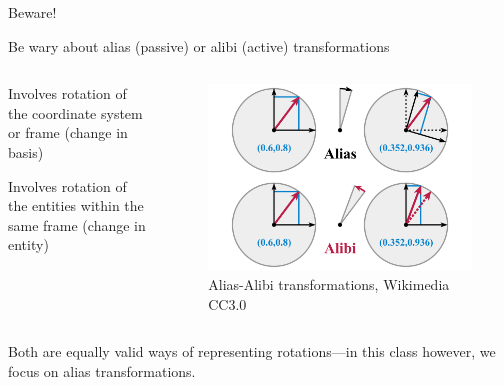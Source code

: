\documentclass[presentation]{beamer}
\begin{document}
\begin{frame}[label={sec:org70ef83a}]{Beware!}
\begin{block}{Be wary about alias (passive) or alibi (active) transformations}
\end{block}
\begin{columns}
\begin{column}{0.55\columnwidth}
\begin{definition}
Involves rotation of the coordinate system or frame
(change in basis)
\end{definition}
\begin{definition}
Involves rotation of the entities within the same
frame (change in entity)
\end{definition}
\end{column}
\begin{column}{0.5\columnwidth}
\begin{figure}[htbp]
\centering
\includegraphics[width=1.00\textwidth]{images/alias_alibi.png}
\caption{Alias-Alibi transformations, Wikimedia CC3.0}
\end{figure}
\end{column}
\end{columns}
Both are equally valid ways of representing rotations---in this class
however, we focus on alias transformations.
\end{frame}
\end{document}
